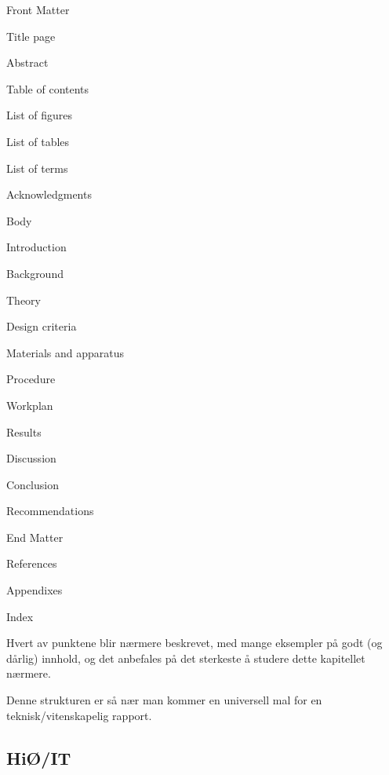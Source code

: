 \begin{compactitem}
\item Front Matter
\begin{compactitem}
\item Title page
\item Abstract
\item Table of contents
\item List of figures
\item List of tables
\item List of terms
\item Acknowledgments
\end{compactitem}

\item Body
\begin{compactitem}
\item Introduction
\item Background
\item Theory
\item Design criteria
\item Materials and apparatus
\item Procedure
\item Workplan
\item Results
\item Discussion
\item Conclusion
\item Recommendations
\end{compactitem}

\item End Matter
\begin{compactitem}
\item References
\item Appendixes
\item Index
\end{compactitem}

\end{compactitem}

Hvert av punktene blir nærmere beskrevet, med mange eksempler på godt (og dårlig) innhold, og det anbefales på det sterkeste å  studere dette kapitellet nærmere. 

Denne strukturen er så nær man kommer en universell mal for en teknisk/vitenskapelig rapport.

\subsection{HiØ/IT}
\label{sec:hiof-it}

